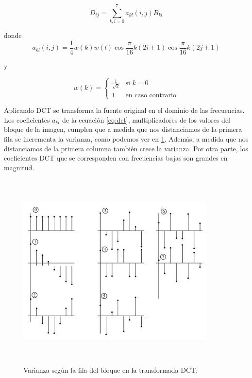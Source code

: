 \begin{equation}
D_{ij} = \sum_{k,l=0}^{7}a_{kl}(i,j)B_{kl} \nonumber
\end{equation}

donde
\begin{equation} \label{eq:dct}
a_{kl}(i,j) = \frac{1}{4}w(k)w(l)\cos\frac{\pi}{16}k(2i+1)\cos\frac{\pi}{16}k(2j+1) 
\end{equation}

y

\begin{equation}
w(k) = 
\begin{cases}
\frac{\displaystyle 1}{\displaystyle\sqrt{2}} & \text{si $k=0$}\\
1 & \text{en caso contrario} \nonumber
\end{cases}
\end{equation}

Aplicando DCT se transforma la fuente original en el dominio de las frecuencias. Los coeficientes $a_{kl}$ de la ecuación \ref{eq:dct}, multiplicadores de los valores del bloque de la imagen, cumplen que a medida que nos distanciamos de la primera fila se incrementa la varianza, como podemos ver en \ref{fig_dct}. Además, a medida que nos distanciamos de la primera columna también crece la varianza. Por otra parte, los coeficientes DCT que se corresponden con frecuencias bajas son grandes en magnitud.

\begin{figure}[ht!]
\begin{center}
\includegraphics[width=10cm,height=10cm,keepaspectratio]{figuras/dct.png}
\end{center}
\caption{Varianza según la fila del bloque en la transformada DCT, \cite{b4:2012}}
\label{fig_dct}
\end{figure}


